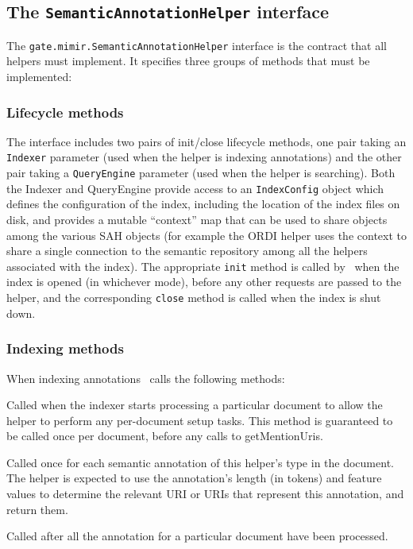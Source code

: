 \subsection{The {\tt SemanticAnnotationHelper} interface}

The {\tt gate.mimir.SemanticAnnotationHelper} interface is the contract that
all helpers must implement.  It specifies three groups of methods that must be
implemented:

\subsubsection*{Lifecycle methods}

The interface includes two pairs of init/close lifecycle methods, one pair
taking an {\tt Indexer} parameter (used when the helper is indexing
annotations) and the other pair taking a {\tt QueryEngine} parameter (used when
the helper is searching).  Both the Indexer and QueryEngine provide access to
an {\tt IndexConfig} object which defines the configuration of the index,
including the location of the index files on disk, and provides a mutable
``context'' map that can be used to share objects among the various SAH objects
(for example the ORDI helper uses the context to share a single connection to
the semantic repository among all the helpers associated with the index).  The
appropriate {\tt init} method is called by \Mimir\ when the index is opened (in
whichever mode), before any other requests are passed to the helper, and the
corresponding {\tt close} method is called when the index is shut down.

\subsubsection*{Indexing methods}

When indexing annotations \Mimir\ calls the following methods:

\bde
\item[documentStart(document)] Called when the indexer starts processing a
  particular document to allow the helper to perform any per-document setup
  tasks.  This method is guaranteed to be called once per document, before any
  calls to getMentionUris.
\item[getMentionUris(annotation, length, indexer)] Called once for each
  semantic annotation of this helper's type in the document.  The helper is
  expected to use the annotation's length (in tokens) and feature values to
  determine the relevant URI or URIs that represent this annotation, and return
  them. 
\item[documentEnd()] Called after all the annotation for a particular document
  have been processed.
\ede

